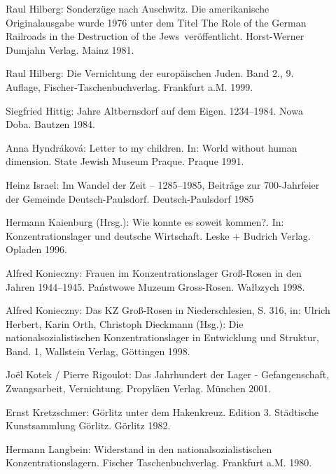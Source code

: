 \begin{description}
\item[]{Raul Hilberg: \glqq Sonderzüge nach Auschwitz\grqq. Die amerikanische Originalausgabe wurde 1976 unter dem Titel \glqq The Role of the German Railroads in the Destruction of the Jews\grqq~veröffentlicht. Horst-Werner Dumjahn Verlag. Mainz 1981.}

\item[]{Raul Hilberg: \glqq Die Vernichtung der europäischen Juden\grqq. Band 2., 9. Auflage, Fischer-Taschenbuchverlag. Frankfurt a.M. 1999.}

\item[]{Siegfried Hittig:  Jahre Altbernsdorf auf dem Eigen. 1234--1984\grqq. Nowa Doba. Bautzen 1984.}

\item[]{Anna Hyndr\'akov\'a: \glqq Letter to my children\grqq. In: \glqq World without human dimension\grqq. State Jewish Museum Praque. Praque 1991.}

\item[]{Heinz Israel: \glqq Im Wandel der Zeit -- 1285--1985, Beiträge zur 700-Jahrfeier der Gemeinde Deutsch-Paulsdorf\grqq. Deutsch-Paulsdorf 1985}

\item[]{Hermann Kaienburg (Hrsg.): \glqq Wie konnte es soweit kommen?\grqq. In: \glqq Konzentrationslager und deutsche Wirtschaft\grqq. Leske + Budrich Verlag. Opladen 1996.}

\item[]{Alfred Konieczny: \glqq Frauen im Konzentrationslager Groß-Rosen in den Jahren 1944--1945\grqq. Państwowe Muzeum Gross-Rosen. Wa\l bzych 1998.} 

\item[]{Alfred Konieczny: \glqq Das KZ Groß-Rosen in Niederschlesien\grqq, S. 316, in: Ulrich Herbert, Karin Orth, Christoph Dieckmann (Hsg.): \glqq Die nationalsozialistischen Konzentrationslager in Entwicklung und Struktur, Band. 1\grqq, Wallstein Verlag, Göttingen 1998.}

\item[]{Jo\"el Kotek / Pierre Rigoulot: \glqq Das Jahrhundert der Lager - Gefangenschaft, Zwangsarbeit, Vernichtung\grqq. Propyläen Verlag. München 2001.}

\item[]{Ernst Kretzschmer: \glqq Görlitz unter dem Hakenkreuz\grqq. Edition 3. Städtische Kunstsammlung Görlitz. Görlitz 1982. }

\item[]{Hermann Langbein: \glqq Widerstand in den nationalsozialistischen Konzentrationslagern\grqq. Fischer Taschenbuchverlag. Frankfurt a.M. 1980.}


\end{description}
